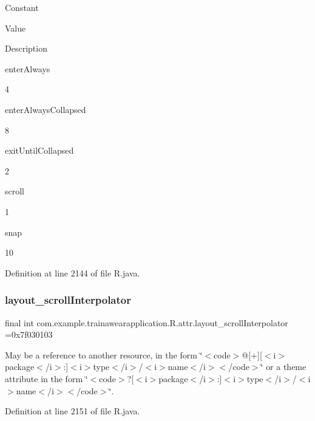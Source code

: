 Constant

Value

Description 

enter\+Always

4

enter\+Always\+Collapsed

8

exit\+Until\+Collapsed

2

scroll

1

snap

10

Definition at line 2144 of file R.\+java.

\mbox{\label{classcom_1_1example_1_1trainawearapplication_1_1_r_1_1attr_a301d219297877fd9fba9237120f62ad6}} 
\subsubsection{\texorpdfstring{layout\_scrollInterpolator}{layout\_scrollInterpolator}}
{\footnotesize\ttfamily final int com.\+example.\+trainawearapplication.\+R.\+attr.\+layout\+\_\+scroll\+Interpolator =0x7f030103\hspace{0.3cm}{\ttfamily [static]}}

May be a reference to another resource, in the form \char`\"{}$<$code$>$@\mbox{[}+\mbox{]}\mbox{[}$<$i$>$package$<$/i$>$\+:\mbox{]}$<$i$>$type$<$/i$>$/$<$i$>$name$<$/i$>$$<$/code$>$\char`\"{} or a theme attribute in the form \char`\"{}$<$code$>$?\mbox{[}$<$i$>$package$<$/i$>$\+:\mbox{]}$<$i$>$type$<$/i$>$/$<$i$>$name$<$/i$>$$<$/code$>$\char`\"{}. 

Definition at line 2151 of file R.\+java.

\mbox{\label{classcom_1_1example_1_1trainawearapplication_1_1_r_1_1attr_a3f8a3543713dc5f7f2fd48eb631c17e2}} 
